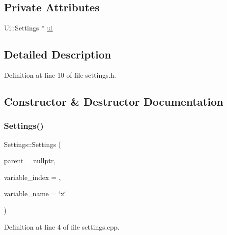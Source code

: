 \subsection*{Private Attributes}
\begin{DoxyCompactItemize}
\item 
Ui\+::\+Settings $\ast$ \hyperlink{classSettings_a98680be421d0ae7c34a57f2a159eacd4}{ui}
\end{DoxyCompactItemize}


\subsection{Detailed Description}


Definition at line 10 of file settings.\+h.



\subsection{Constructor \& Destructor Documentation}
\mbox{\label{classSettings_a80f4b466d49dd6e7b730700ff8eb97e0}} 
\subsubsection{\texorpdfstring{Settings()}{Settings()}\hspace{0.1cm}{\footnotesize\ttfamily [1/2]}}
{\footnotesize\ttfamily Settings\+::\+Settings (\begin{DoxyParamCaption}\item[{Q\+Widget $\ast$}]{parent = {\ttfamily nullptr},  }\item[{int}]{variable\+\_\+index = {},  }\item[{const Q\+String \&}]{variable\+\_\+name = {\ttfamily \char`\"{}x\char`\"{}} }\end{DoxyParamCaption})\hspace{0.3cm}{\ttfamily [explicit]}}



Definition at line 4 of file settings.\+cpp.

\mbox{\label{classSettings_afbd1735d66d180763e00dc167919e368}} 
